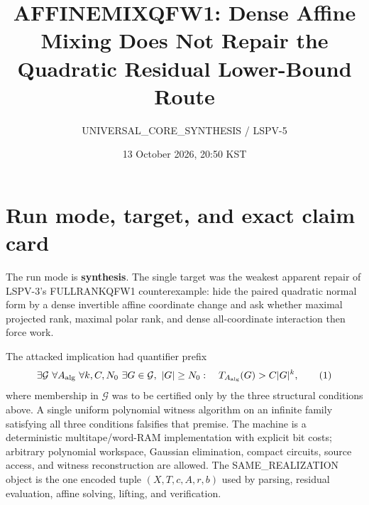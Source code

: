 \documentclass[11pt]{article}
\title{AFFINEMIXQFW1: Dense Affine Mixing Does Not Repair the Quadratic Residual Lower-Bound Route}
\author{UNIVERSAL\_CORE\_SYNTHESIS / LSPV-5}
\date{13 October 2026, 20:50 KST}
\begin{document}
\maketitle

\begin{center}
\end{center}

\section{Run mode, target, and exact claim card}
The run mode is \textbf{synthesis}.  The single target was the weakest apparent
repair of LSPV-3's FULLRANKQFW1 counterexample: hide the paired quadratic normal
form by a dense invertible affine coordinate change and ask whether maximal
projected rank, maximal polar rank, and dense all-coordinate interaction then
force work.

The attacked implication had quantifier prefix
\[
 \exists\mathcal G\ \forall A_{\rm alg}\ \forall k,C,N_0\
 \exists G\in\mathcal G,\ |G|\ge N_0:\quad
 T_{A_{\rm alg}}(G)>C|G|^k,                              \tag{1}
\]
where membership in $\mathcal G$ was to be certified only by the three
structural conditions above.  A single uniform polynomial witness algorithm
on an infinite family satisfying all three conditions falsifies that premise.
The machine is a deterministic multitape/word-RAM implementation with explicit
bit costs; arbitrary polynomial workspace, Gaussian elimination, compact
circuits, source access, and witness reconstruction are allowed.  The
SAME\_REALIZATION object is the one encoded tuple
$(X,T,c,A,r,b)$ used by parsing, residual evaluation, affine solving, lifting,
and verification.
\end{document}
